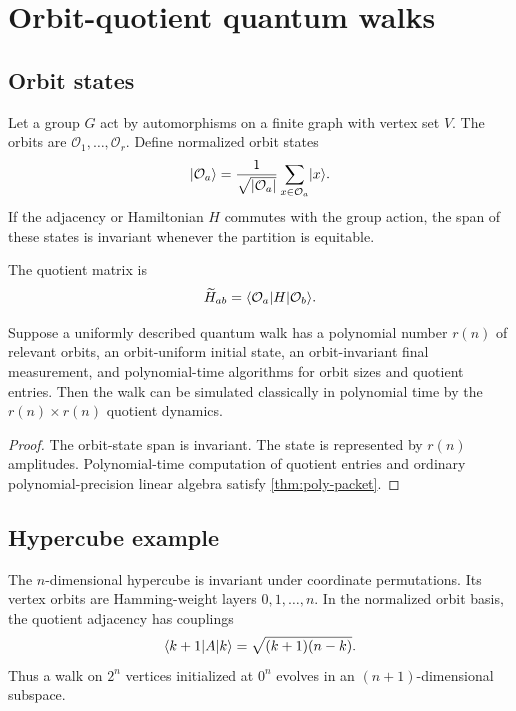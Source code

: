 \chapter{Orbit-quotient quantum walks}
\label{ch:orbit-quotients}

\section{Orbit states}
Let a group $G$ act by automorphisms on a finite graph with vertex set $V$. The orbits are $\mathcal O_1,\ldots,\mathcal O_r$. Define normalized orbit states
\[
\lvert \mathcal O_a\rangle
=
\frac1{\sqrt{|\mathcal O_a|}}
\sum_{x\in\mathcal O_a}\lvert x\rangle.
\]
If the adjacency or Hamiltonian $H$ commutes with the group action, the span of these states is invariant whenever the partition is equitable.

The quotient matrix is
\[
\widetilde H_{ab}
=
\langle \mathcal O_a\rvert H\lvert \mathcal O_b\rangle.
\]

\begin{theorem}
\label{thm:orbit-collapse}
Suppose a uniformly described quantum walk has a polynomial number $r(n)$ of relevant orbits, an orbit-uniform initial state, an orbit-invariant final measurement, and polynomial-time algorithms for orbit sizes and quotient entries. Then the walk can be simulated classically in polynomial time by the $r(n)\times r(n)$ quotient dynamics.
\end{theorem}

\begin{proof}
The orbit-state span is invariant. The state is represented by $r(n)$ amplitudes. Polynomial-time computation of quotient entries and ordinary polynomial-precision linear algebra satisfy \cref{thm:poly-packet}.
\end{proof}

\section{Hypercube example}
The $n$-dimensional hypercube is invariant under coordinate permutations. Its vertex orbits are Hamming-weight layers $0,1,\ldots,n$. In the normalized orbit basis, the quotient adjacency has couplings
\begin{equation}
\langle k+1\rvert A\lvert k\rangle
=
\sqrt{(k+1)(n-k)}.
\label{eq:hypercube-coupling}
\end{equation}
Thus a walk on $2^n$ vertices initialized at $0^n$ evolves in an $(n+1)$-dimensional subspace.


